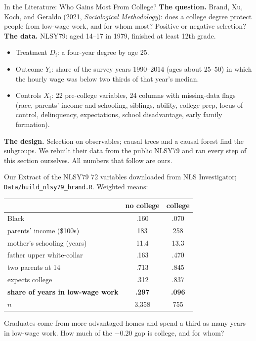 \documentclass[aspectratio=169,11pt,xcolor=dvipsnames]{beamer}
\begin{document}
\begin{frame}{In the Literature: Who Gains Most From College?}
\textbf{The question.} Brand, Xu, Koch, and Geraldo (2021, \textit{Sociological Methodology}):
does a college degree protect people from low-wage work, and for whom most? Positive or
negative selection?
\vskip3pt
\textbf{The data.} NLSY79: aged 14--17 in 1979, finished at least 12th grade.
\begin{itemize}\itemsep2pt
  \item Treatment $D_i$: a four-year degree by age 25.
  \item Outcome $Y_i$: share of the survey years 1990--2014 (ages about 25--50) in which the
        hourly wage was below two thirds of that year's median.
  \item Controls $X_i$: 22 pre-college variables, 24 columns with missing-data flags (race, parents' income and schooling,
        siblings, ability, college prep, locus of control, delinquency, expectations,
        school disadvantage, early family formation).
\end{itemize}
\vskip2pt
\textbf{The design.} Selection on observables; causal trees and a causal forest find the subgroups.
\vskip3pt
{\small We rebuilt their data from the public NLSY79 and ran every step of this section
ourselves. All numbers that follow are ours.}
\end{frame}

\begin{frame}{Our Extract of the NLSY79}
72 variables downloaded from NLS Investigator; \texttt{Data/build\_nlsy79\_brand.R}.
Weighted means:
\begin{center}\small
\renewcommand{\arraystretch}{1.08}
\begin{tabular}{@{}lcc@{}}
\toprule
& no college & college \\
\midrule
Black & .160 & .070 \\
parents' income (\$100s) & 183 & 258 \\
mother's schooling (years) & 11.4 & 13.3 \\
father upper white-collar & .163 & .470 \\
two parents at 14 & .713 & .845 \\
expects college & .312 & .837 \\
\midrule
\textbf{share of years in low-wage work} & \textbf{.297} & \textbf{.096} \\
$n$ & 3,358 & 755 \\
\bottomrule
\end{tabular}
\end{center}
\vskip-2pt
{\small Graduates come from more advantaged homes and spend a third as many years in low-wage
work. How much of the $-0.20$ gap is college, and for whom?}
\end{frame}
\end{document}
